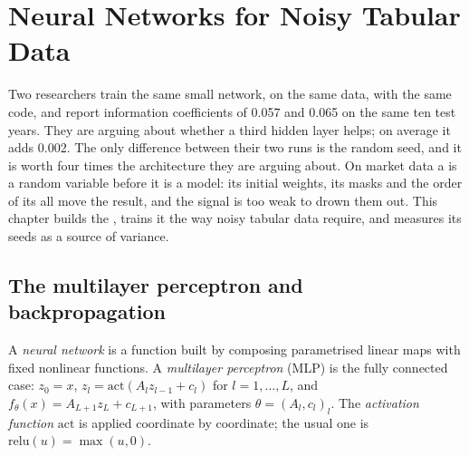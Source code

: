 \chapter{Neural Networks for Noisy Tabular Data}\label{ch:ml:neural-networks-for-noisy-tabular-data}

Two researchers train the same small network, on the same data, with the same code, and report information coefficients
of 0.057 and 0.065 on the same ten test years. They are arguing about whether a third hidden layer helps; on average it
adds 0.002. The only difference between their two runs is the random seed, and it is worth four times the architecture
they are arguing about. On market data a  is a random variable before it is a model: its initial weights,
its  masks and the order of its  all move the result, and the signal is too weak to drown them out.
This chapter builds the , trains it the way noisy tabular data require, and measures its seeds as a
source of variance.

\section{The multilayer perceptron and backpropagation}

\begin{definition}\label{def:ml:neural-networks-for-noisy-tabular-data:mlp}
A \emph{neural network} is a function built by composing parametrised linear maps with fixed
nonlinear functions. A \emph{multilayer perceptron} (MLP) is the fully connected case:
$z_0 = x$, $z_l = \mathrm{act}(A_lz_{l-1} + c_l)$ for $l = 1,\dots,L$, and $f_\theta(x) = A_{L+1}z_L + c_{L+1}$, with
parameters $\theta = (A_l, c_l)_l$. The \emph{activation function} $\mathrm{act}$ is applied
coordinate by coordinate; the usual one is $\mathrm{relu}(u) = \max(u, 0)$.
\end{definition}

